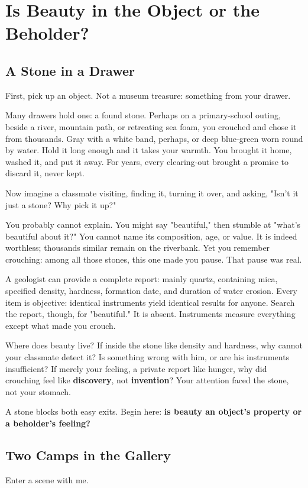 \chapter[Beauty: Object or Beholder?]{Is Beauty in the Object or the Beholder?}
\section{A Stone in a Drawer}
First, pick up an object. Not a museum treasure: something from your drawer.

Many drawers hold one: a found stone. Perhaps on a primary-school outing, beside a river, mountain path, or retreating sea foam, you crouched and chose it from thousands. Gray with a white band, perhaps, or deep blue-green worn round by water. Hold it long enough and it takes your warmth. You brought it home, washed it, and put it away. For years, every clearing-out brought a promise to discard it, never kept.

Now imagine a classmate visiting, finding it, turning it over, and asking, "Isn't it just a stone? Why pick it up?"

You probably cannot explain. You might say "beautiful," then stumble at "what's beautiful about it?" You cannot name its composition, age, or value. It is indeed worthless; thousands similar remain on the riverbank. Yet you remember crouching: among all those stones, this one made you pause. That pause was real.

A geologist can provide a complete report: mainly quartz, containing mica, specified density, hardness, formation date, and duration of water erosion. Every item is objective: identical instruments yield identical results for anyone. Search the report, though, for "beautiful." It is absent. Instruments measure everything except what made you crouch.

Where does beauty live? If inside the stone like density and hardness, why cannot your classmate detect it? Is something wrong with him, or are his instruments insufficient? If merely your feeling, a private report like hunger, why did crouching feel like \textbf{discovery}, not \textbf{invention}? Your attention faced the stone, not your stomach.

A stone blocks both easy exits. Begin here: \textbf{is beauty an object's property or a beholder's feeling?}

\section{Two Camps in the Gallery}
Enter a scene with me.

